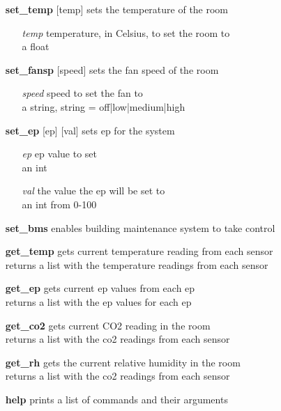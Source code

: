 \documentclass[twoside]{article}
\begin{document}
	\begin{enumerate}
		
		\item[\bf set\_temp] [temp]
		sets the temperature of the room	
		\begin{enumerate}[leftmargin=3\parindent]
			\item[\it temp] temperature, in Celsius, to set the room to\\
			a float
		\end{enumerate}
		
		\item[\bf set\_fansp] [speed]
		sets the fan speed of the room
		\begin{enumerate}[leftmargin=3\parindent]
			\item[\it speed] speed to set the fan to\\ 
			a string, string = off|low|medium|high
		\end{enumerate}
		
		\item[\bf set\_ep] [ep] [val]
		sets ep for the system
		\begin{enumerate}[leftmargin=3\parindent]
			\item[\it ep] ep value to set\\ 
			an int
			\item[\it val] the value the ep will be set to\\ 
			an int from 0-100
		\end{enumerate}
		
		\item[\bf set\_bms]	enables building maintenance system to take control
		
		\item[\bf get\_temp] gets current temperature reading from each sensor \\
		returns a list with the temperature readings from each sensor
		
		\item[\bf get\_ep] gets current ep values from each ep \\
		returns a list with the ep values for each ep
		
		\item[\bf get\_co2] gets current CO2 reading in the room \\
		returns a list with the co2 readings from each sensor
		
		\item[\bf get\_rh] gets the current relative humidity in the room \\
		returns a list with the co2 readings from each sensor
		
		\item[\bf help] prints a list of commands and their arguments
	\end{enumerate}
\end{document}
